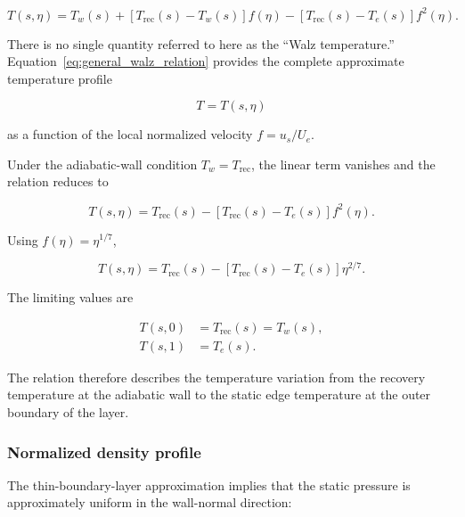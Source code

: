 \begin{equation}
    \boxed{
    T(s,\eta)
    =
    T_w(s)
    +
    \left[
        T_{\mathrm{rec}}(s)-T_w(s)
    \right]f(\eta)
    -
    \left[
        T_{\mathrm{rec}}(s)-T_e(s)
    \right]f^2(\eta)
    }.
    \label{eq:general_walz_relation}
\end{equation}

There is no single quantity referred to here as the ``Walz temperature.''
Equation~\eqref{eq:general_walz_relation} provides the complete approximate
temperature profile

\begin{equation}
    T=T(s,\eta)
\end{equation}

as a function of the local normalized velocity \(f=u_s/U_e\).

Under the adiabatic-wall condition \(T_w=T_{\mathrm{rec}}\), the linear term
vanishes and the relation reduces to

\begin{equation}
    \boxed{
    T(s,\eta)
    =
    T_{\mathrm{rec}}(s)
    -
    \left[
        T_{\mathrm{rec}}(s)-T_e(s)
    \right]f^2(\eta)
    }.
    \label{eq:adiabatic_walz_relation}
\end{equation}

Using \(f(\eta)=\eta^{1/7}\),

\begin{equation}
    \boxed{
    T(s,\eta)
    =
    T_{\mathrm{rec}}(s)
    -
    \left[
        T_{\mathrm{rec}}(s)-T_e(s)
    \right]\eta^{2/7}
    }.
    \label{eq:adiabatic_walz_eta}
\end{equation}

The limiting values are

\begin{align}
    T(s,0)
    &=
    T_{\mathrm{rec}}(s)
    =
    T_w(s),
    \\
    T(s,1)
    &=
    T_e(s).
\end{align}

The relation therefore describes the temperature variation from the recovery
temperature at the adiabatic wall to the static edge temperature at the outer
boundary of the layer.

\subsubsection{Normalized density profile}

The thin-boundary-layer approximation implies that the static pressure is
approximately uniform in the wall-normal direction:

